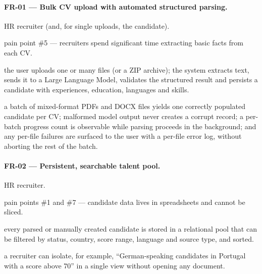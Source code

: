 \paragraph{FR-01 --- Bulk CV upload with automated structured parsing.}
\begin{description}[noitemsep]
	\item[Actor:] HR recruiter (and, for single uploads, the candidate).
	\item[Rationale:] pain point \#5 --- recruiters spend significant time extracting basic facts from each CV.
	\item[Behaviour:] the user uploads one or many files (or a ZIP archive); the system extracts text, sends it to a Large Language Model, validates the structured result and persists a candidate with experiences, education, languages and skills.
	\item[Acceptance:] a batch of mixed-format PDFs and DOCX files yields one correctly populated candidate per CV; malformed model output never creates a corrupt record; a per-batch progress count is observable while parsing proceeds in the background; and any per-file failures are surfaced to the user with a per-file error log, without aborting the rest of the batch.
\end{description}

\paragraph{FR-02 --- Persistent, searchable talent pool.}
\begin{description}[noitemsep]
	\item[Actor:] HR recruiter.
	\item[Rationale:] pain points \#1 and \#7 --- candidate data lives in spreadsheets and cannot be sliced.
	\item[Behaviour:] every parsed or manually created candidate is stored in a relational pool that can be filtered by status, country, score range, language and source type, and sorted.
	\item[Acceptance:] a recruiter can isolate, for example, ``German-speaking candidates in Portugal with a score above 70'' in a single view without opening any document.
\end{description}

